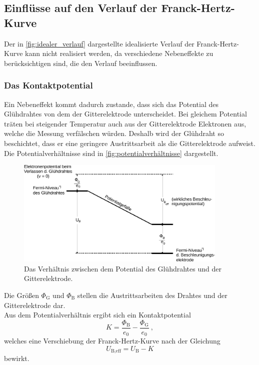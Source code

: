 \subsection{Einflüsse auf den Verlauf der Franck-Hertz-Kurve}
\label{sec:einflüsse}

    Der in \autoref{fig:idealer_verlauf} dargestellte idealisierte Verlauf der Franck-Hertz-Kurve
    kann nicht realisiert werden,
    da verschiedene Nebeneffekte zu berücksichtigen sind,
    die den Verlauf beeinflussen.


\subsubsection{Das Kontaktpotential}
\label{sec:einflüsse:kontaktpotential}

    Ein Nebeneffekt kommt dadurch zustande,
    dass sich das Potential des Glühdrahtes von dem der Gitterelektrode unterscheidet.
    Bei gleichem Potential träten bei steigender Temperatur auch aus der Gitterelektrode Elektronen aus,
    welche die Messung verfälschen würden.
    Deshalb wird der Glühdraht so beschichtet,
    dass er eine geringere Austrittsarbeit als die Gitterelektrode aufweist.\\
    Die Potentialverhältnisse sind in \autoref{fig:potentialverhältnisse} dargestellt.
    \begin{figure}[H]
        \centering
        \includegraphics[width=0.9\textwidth]{content/img/Abb_3.pdf}
        \caption{Das Verhältnis zwischen dem Potential des Glühdrahtes und der Gitterelektrode. \cite{versuchsanleitung}}
        \label{fig:potentialverhältnisse}
    \end{figure}
    Die Größen $\Phi_\text{G}$ und $\Phi_\text{B}$ stellen die Austrittsarbeiten des Drahtes und der Gitterelektrode dar.\\
    Aus dem Potentialverhältnis ergibt sich ein Kontaktpotential
    \begin{equation*}
        K = \frac{\Phi_\text{B}}{e_0} - \frac{\Phi_\text{G}}{e_0} \ ,
    \end{equation*}
    welches eine Verschiebung der Franck-Hertz-Kurve nach der Gleichung
    \begin{equation}
        U_\text{B,eff} = U_\text{B} - K
        \label{eqn:kontaktpotential_verschiebung}
    \end{equation}
    bewirkt.


